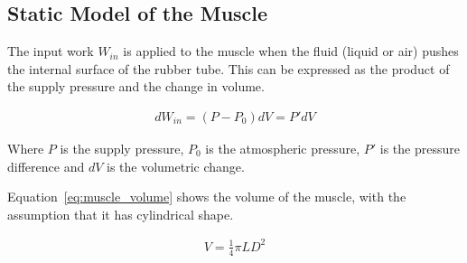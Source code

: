 
\subsection{Static Model of the Muscle}

The input work $W_{in}$ is applied to the muscle when the fluid (liquid or air)
pushes the internal surface of the rubber tube.
This can be expressed as the product of the supply pressure and the change in volume.

\begin{align}
	dW_{in} = \left( P - P_0 \right)dV = P'dV
	\label{eq:input_work}
\end{align}

Where $P$ is the supply pressure, $P_0$ is the atmospheric pressure,
$P'$ is the pressure difference and $dV$ is the volumetric change.

Equation~\ref{eq:muscle_volume} shows the volume of the muscle,
with the assumption that it has cylindrical shape.

\begin{align}
	V = \frac{1}{4}\pi L D^2
	\label{eq:muscle_volume}
\end{align}










